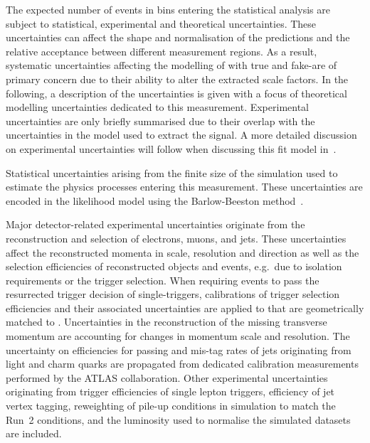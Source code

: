 The expected number of events in bins entering the statistical
analysis are subject to statistical, experimental and theoretical
uncertainties. These uncertainties can affect the shape and
normalisation of the predictions and the relative acceptance between
different measurement regions. As a result, systematic uncertainties
affecting the modelling of \ttbar with true and fake-\tauhadvis are of
primary concern due to their ability to alter the extracted scale
factors. In the following, a description of the uncertainties is given
with a focus of theoretical modelling uncertainties dedicated to this
measurement. Experimental uncertainties are only briefly summarised
due to their overlap with the uncertainties in the model used to
extract the \HH signal. A more detailed discussion on experimental
uncertainties will follow when discussing this fit model
in~.

Statistical uncertainties arising from the finite size of the
simulation used to estimate the physics processes entering this
measurement. These uncertainties are encoded in the likelihood model
using the Barlow-Beeston method~\cite{barlow1993,conway2011}.

Major detector-related experimental uncertainties originate from the
reconstruction and selection of electrons, muons, \tauhadvis and jets.
These uncertainties affect the reconstructed momenta in scale,
resolution and direction as well as the selection efficiencies of
reconstructed objects and events, e.g.~due to isolation requirements
or the trigger selection. When requiring events to pass the
resurrected trigger decision of single-\tauhadvis triggers,
calibrations of trigger selection efficiencies and their associated
uncertainties are applied to \tauhadvis that are geometrically matched
to \tauhad. Uncertainties in the reconstruction of the missing
transverse momentum are accounting for changes in momentum scale and
resolution. The uncertainty on efficiencies for \bjets passing \btag
and mis-tag rates of jets originating from light and charm quarks are
propagated from dedicated calibration measurements performed by the
ATLAS collaboration. Other experimental uncertainties originating from
trigger efficiencies of single lepton triggers, efficiency of jet
vertex tagging, reweighting of pile-up conditions in simulation to
match the Run~2 conditions, and the luminosity used to normalise the
simulated datasets are included.


